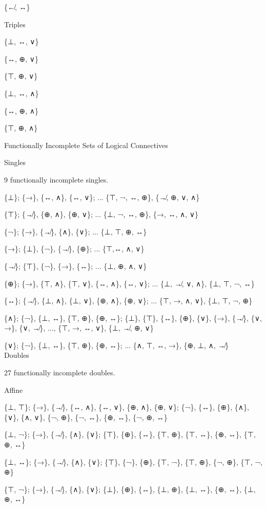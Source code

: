 \{↚, ↔\}

\protect\hypertarget{anchor-5}{}{}Triples

\{⊥, ↔, ∨\}

\{↔, ⊕, ∨\}

\{⊤, ⊕, ∨\}

\{⊥, ↔, ∧\}

\{↔, ⊕, ∧\}

\{⊤, ⊕, ∧\}

\protect\hypertarget{anchor-6}{}{}Functionally Incomplete Sets of
Logical Connectives

\protect\hypertarget{anchor-7}{}{}Singles

9 functionally incomplete singles.

\{⊥\}; \{→\}, \{↔, ∧\}, \{↔, ∨\}; ... \{⊤, ¬, ↔, ⊕\}, \{↛, ⊕, ∨, ∧\}

\{⊤\}; \{↛\}, \{⊕, ∧\}, \{⊕, ∨\}; ... \{⊥, ¬, ↔, ⊕\}, \{→, ↔, ∧, ∨\}

\{¬\}; \{→\}, \{↛\}, \{∧\}, \{∨\}; ... \{⊥, ⊤, ⊕, ↔\}

\{→\}; \{⊥\}, \{¬\}, \{↛\}, \{⊕\}; ... \{⊤,↔, ∧, ∨\}

\{↛\}; \{⊤\}, \{¬\}, \{→\}, \{↔\}; ... \{⊥, ⊕, ∧, ∨\}

\{⊕\}; \{→\}, \{⊤, ∧\}, \{⊤, ∨\}, \{↔, ∧\}, \{↔, ∨\}; ... \{⊥, ↛, ∨,
∧\}, \{⊥, ⊤, ¬, ↔\}

\{↔\}; \{↛\}, \{⊥, ∧\}, \{⊥, ∨\}, \{⊕, ∧\}, \{⊕, ∨\}; ... \{⊤, →, ∧,
∨\}, \{⊥, ⊤, ¬, ⊕\}

\{∧\}; \{¬\}, \{⊥, ↔\}, \{⊤, ⊕\}, \{⊕, ↔\}; \{⊥\}, \{⊤\}, \{↔\}, \{⊕\},
\{∨\}, \{→\}, \{↛\}, \{∨, →\}, \{∨, ↛\}, ..., \{⊤, →, ↔, ∨\}, \{⊥, ↛, ⊕,
∨\}

\{∨\}; \{¬\}, \{⊥, ↔\}, \{⊤, ⊕\}, \{⊕, ↔\}; ... \{∧, ⊤, ↔, →\}, \{⊕, ⊥,
∧, ↛\}\\

\protect\hypertarget{anchor-8}{}{}Doubles

27 functionally incomplete doubles.

\protect\hypertarget{anchor-9}{}{}Affine

\{⊥, ⊤\}; \{→\}, \{↛\}, \{↔, ∧\}, \{↔, ∨\}, \{⊕, ∧\}, \{⊕, ∨\}; \{¬\},
\{↔\}, \{⊕\}, \{∧\}, \{∨\}, \{∧, ∨\}, \{¬, ⊕\}, \{¬, ↔\}, \{⊕, ↔\}, \{¬,
⊕, ↔\}

\{⊥, ¬\}; \{→\}, \{↛\}, \{∧\}, \{∨\}; \{⊤\}, \{⊕\}, \{↔\}, \{⊤, ⊕\},
\{⊤, ↔\}, \{⊕, ↔\}, \{⊤, ⊕, ↔\}

\{⊥, ↔\}; \{→\}, \{↛\}, \{∧\}, \{∨\}; \{⊤\}, \{¬\}, \{⊕\}, \{⊤, ¬\},
\{⊤, ⊕\}, \{¬, ⊕\}, \{⊤, ¬, ⊕\}

\{⊤, ¬\}; \{→\}, \{↛\}, \{∧\}, \{∨\}; \{⊥\}, \{⊕\}, \{↔\}, \{⊥, ⊕\},
\{⊥, ↔\}, \{⊕, ↔\}, \{⊥, ⊕, ↔\}

